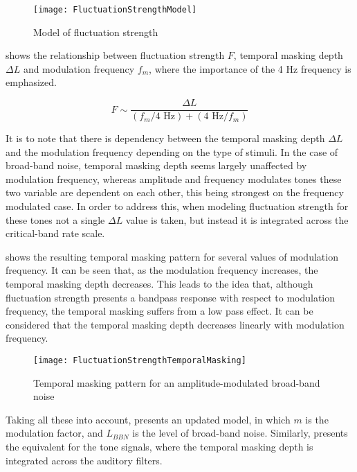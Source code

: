\documentclass[../main.tex]{subfiles}
\begin{document}
\begin{theoreticalbackground}
\begin{figure}
    \centering
    \texttt{[image: FluctuationStrengthModel]}
    \caption{Model of fluctuation strength
        \cite[pp. 254]{Fastl2007Psychoacoustics}}
    \label{fig:flucstrenmodel}
\end{figure}

 shows the relationship between fluctuation
strength $F$, temporal masking depth $\Delta L$ and modulation frequency
$f_{m}$, where the importance of the 4 Hz frequency is emphasized.

\begin{equation}
    F \sim \frac{\Delta L}{(f_{m}/4\text{ Hz}) + (4\text{ Hz}/f_{m})}
    \label{eq:flucstrentempmaskmodfreq}
\end{equation}

It is to note that there is dependency between the temporal masking depth
$\Delta L$ and the modulation frequency depending on the type of stimuli. In the
case of broad-band noise, temporal masking depth seems largely unaffected by
modulation frequency, whereas amplitude and frequency modulates tones these two
variable are dependent on each other, this being strongest on the frequency
modulated case. In order to address this, when modeling fluctuation strength
for these tones not a single $\Delta L$ value is taken, but instead it is
integrated across the critical-band rate scale.

 shows the resulting temporal masking pattern for
several values of modulation frequency. It can be seen that, as the modulation
frequency increases, the temporal masking depth decreases. This leads to the
idea that, although fluctuation strength presents a bandpass response with
respect to modulation frequency, the temporal masking suffers from a low pass
effect. It can be considered that the temporal masking depth decreases linearly
with modulation frequency.

\begin{figure}
    \centering
    \texttt{[image: FluctuationStrengthTemporalMasking]}
    \caption{Temporal masking pattern for an amplitude-modulated broad-band
        noise \cite[pp. 255]{Fastl2007Psychoacoustics}}
    \label{fig:flucstrenmasking}
\end{figure}

Taking all these into account,  presents an
updated model, in which $m$ is the modulation factor, and $L_{BBN}$ is the level
of broad-band noise. Similarly,  presents the
equivalent for the tone signals, where the temporal masking depth is integrated
across the auditory filters.


\end{theoreticalbackground}
\end{document}
